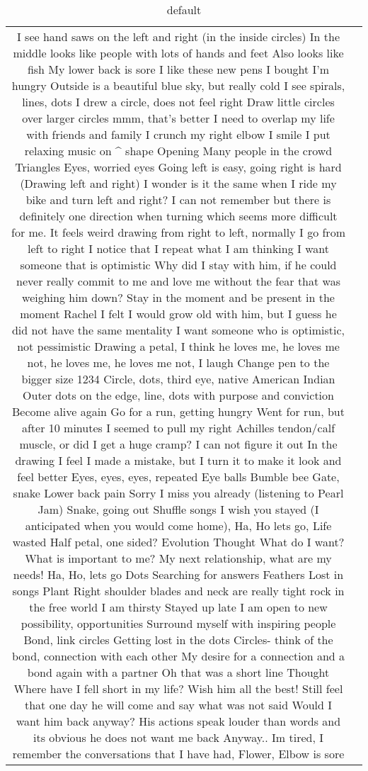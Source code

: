 \begin{table}[htp]
\caption{default}
\begin{center}
\begin{tabular}{|c|c|}
I see hand saws on the left and right (in the inside circles)
In the middle looks like people with lots of hands and feet
Also looks like fish 
My lower back is sore
I like these new pens I bought
I'm hungry
Outside is a beautiful blue sky, but really cold 
I see spirals, lines, dots
I drew a circle, does not feel right
Draw little circles over larger circles mmm, that's better
I need to overlap my life with friends and family
I crunch my right elbow
I smile
I put relaxing music on
^ shape
Opening
Many people in the crowd
Triangles
Eyes, worried eyes
Going left is easy, going right is hard (Drawing left and right)
I wonder is it the same when I ride my bike and turn left and right? I can not remember but there is definitely one direction when turning which seems more difficult for me. 
It feels weird drawing from right to left, normally I go from left to right
I notice that I repeat what I am thinking
I want someone that is optimistic 
Why did I stay with him, if he could never really commit to me and love me without the fear that was weighing him down?
Stay in the moment and be present in the moment Rachel 
I felt I would grow old with him, but I guess he did not have the same mentality
I want someone who is optimistic, not pessimistic
Drawing a petal, I think he loves me, he loves me not, he loves me, he loves me not, I laugh
Change pen to the bigger size
1234
Circle, dots, third eye, native American Indian
Outer dots on the edge, line, dots with purpose and conviction
Become alive again
Go for a run, getting hungry
Went for run, but after 10 minutes I seemed to pull my right Achilles tendon/calf muscle, or did I get a huge cramp? I can not figure it out
In the drawing I feel I made a mistake, but I turn it to make it look and feel better
Eyes, eyes, eyes, repeated 
Eye balls
Bumble bee
Gate, snake
Lower back pain
Sorry I miss you already (listening to Pearl Jam)
Snake, going out
Shuffle songs I wish you stayed (I anticipated when you would come home), Ha, Ho lets go, Life wasted
Half petal, one sided?
Evolution
Thought What do I want? What is important to me? 
My next relationship, what are my needs! Ha, Ho, lets go
Dots
Searching for answers
Feathers
Lost in songs
Plant 
Right shoulder blades and neck are really tight
rock in the free world
I am thirsty
Stayed up late
I am open to new possibility, opportunities
Surround myself with inspiring people 
Bond, link circles
Getting lost in the dots
Circles- think of the bond, connection with each other 
My desire for a connection and a bond again with a partner
Oh that was a short line
Thought Where have I fell short in my life?
Wish him all the best!
Still feel that one day he will come and say what was not said
Would I want him back anyway?
His actions speak louder than words and its obvious he does not want me back
Anyway.. Im tired, I remember the conversations that I have had, Flower, Elbow is sore 
\end{tabular}
\end{center}
\label{default}
\end{table}%

